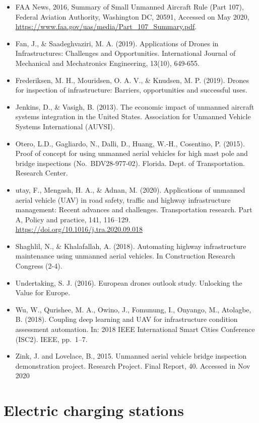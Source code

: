 \documentclass[
]{book}
\providecommand{\tightlist}{%
  \setlength{\itemsep}{0pt}\setlength{\parskip}{0pt}}
\begin{document}
\begin{itemize}
\tightlist
\item
  FAA News, 2016, Summary of Small Unmanned Aircraft Rule (Part 107), Federal Aviation Authority, Washington DC, 20591, Accessed on May 2020, \url{https://www.faa.gov/uas/media/Part_107_Summary.pdf}.
\item
  Fan, J., \& Saadeghvaziri, M. A. (2019). Applications of Drones in Infrastructures: Challenges and Opportunities. International Journal of Mechanical and Mechatronics Engineering, 13(10), 649-655.
\item
  Frederiksen, M. H., Mouridsen, O. A. V., \& Knudsen, M. P. (2019). Drones for inspection of infrastructure: Barriers, opportunities and successful uses.
\item
  Jenkins, D., \& Vasigh, B. (2013). The economic impact of unmanned aircraft systems integration in the United States. Association for Unmanned Vehicle Systems International (AUVSI).
\item
  Otero, L.D., Gagliardo, N., Dalli, D., Huang, W.-H., Cosentino, P. (2015). Proof of concept for using unmanned aerial vehicles for high mast pole and bridge inspections (No.~BDV28-977-02). Florida. Dept. of Transportation. Research Center.
\item
  utay, F., Mengash, H. A., \& Adnan, M. (2020). Applications of unmanned aerial vehicle (UAV) in road safety, traffic and highway infrastructure management: Recent advances and challenges. Transportation research. Part A, Policy and practice, 141, 116--129. \url{https://doi.org/10.1016/j.tra.2020.09.018}
\item
  Shaghlil, N., \& Khalafallah, A. (2018). Automating highway infrastructure maintenance using unmanned aerial vehicles. In Construction Research Congress (2-4).
\item
  Undertaking, S. J. (2016). European drones outlook study. Unlocking the Value for Europe.
\item
  Wu, W., Qurishee, M. A., Owino, J., Fomunung, I., Onyango, M., Atolagbe, B. (2018). Coupling deep learning and UAV for infrastructure condition assessment automation. In: 2018 IEEE International Smart Cities Conference (ISC2). IEEE, pp.~1--7.
\item
  Zink, J. and Lovelace, B., 2015. Unmanned aerial vehicle bridge inspection demonstration project. Research Project. Final Report, 40. Accessed in Nov 2020
\end{itemize}

\hypertarget{electric-charging-stations}{%
\section{Electric charging stations}\label{electric-charging-stations}}
\end{document}
